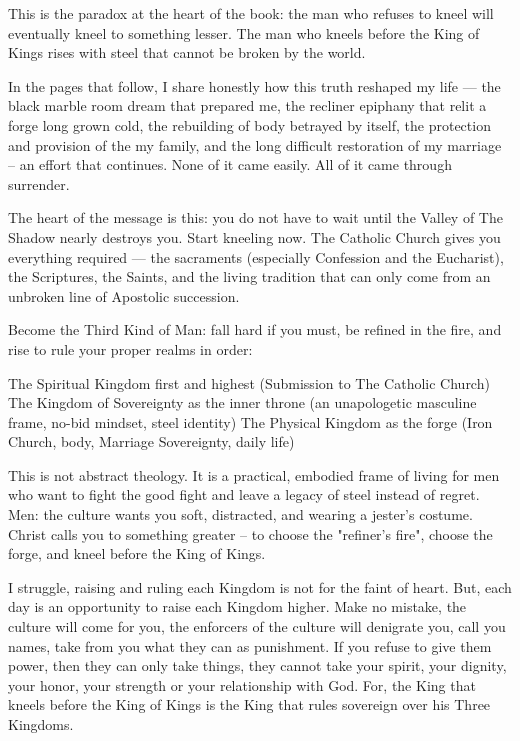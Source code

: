 \documentclass[12pt,a4paper]{book}
\begin{document}
This is the paradox at the heart of the book: the man who refuses to kneel will eventually kneel to something lesser. The man who kneels before the King of Kings rises with steel that cannot be broken by the world.

In the pages that follow, I share honestly how this truth reshaped my life — the black marble room dream that prepared me, the recliner epiphany that relit a forge long grown cold, the rebuilding of body betrayed by itself, the protection and provision of the my family, and the long difficult restoration of my marriage -- an effort that continues.  None of it came easily.  All of it came through surrender.

The heart of the message is this: you do not have to wait until the Valley of The Shadow nearly destroys you.  Start kneeling now.  The Catholic Church gives you everything required — the sacraments (especially Confession and the Eucharist), the Scriptures, the Saints, and the living tradition that can only come from an unbroken line of Apostolic succession.  

Become the Third Kind of Man: fall hard if you must, be refined in the fire, and rise to rule your proper realms in order:

The Spiritual Kingdom first and highest (Submission to The Catholic Church)
The Kingdom of Sovereignty as the inner throne (an unapologetic masculine frame, no-bid mindset, steel identity)
The Physical Kingdom as the forge (Iron Church, body, Marriage Sovereignty, daily life)

This is not abstract theology.  It is a practical, embodied frame of living for men who want to fight the good fight and leave a legacy of steel instead of regret.  Men: the culture wants you soft, distracted, and wearing a jester's costume.   Christ calls you to something greater -- to choose the "refiner's fire", choose the forge, and kneel before the King of Kings.

I struggle, raising and ruling each Kingdom is not for the faint of heart.  But, each day is an opportunity to raise each Kingdom higher.  Make no mistake, the culture will come for you, the enforcers of the culture will denigrate you,  call you names,  take from you what they can as punishment.   If you refuse to give them power, then they can only take things, they cannot take your spirit, your dignity, your honor, your strength or your relationship with God.   For, the King that kneels before the King of Kings is the King that rules sovereign over his Three Kingdoms.
\end{document}

